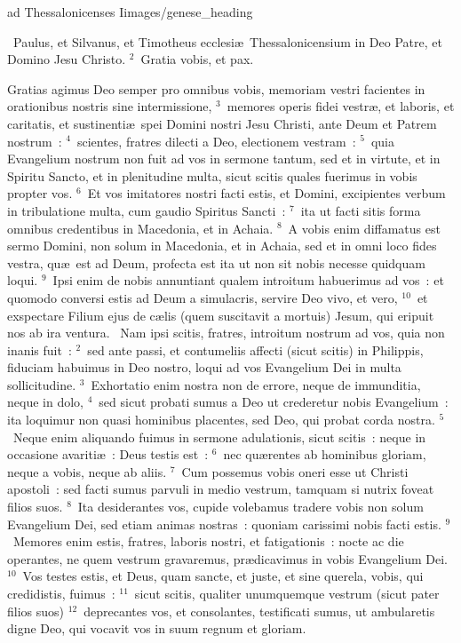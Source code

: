 {ad Thessalonicenses I}{images/genese_heading}

~\lettrine[lines=10,image=true,loversize=0.05,lraise=-0.03]{P}{}aulus, et Silvanus, et Timotheus ecclesi\ae\ Thessalonicensium in Deo Patre, et Domino Jesu Christo.
${}^{2}$~Gratia vobis, et pax.

 Gratias agimus Deo semper pro omnibus vobis, memoriam vestri facientes in orationibus nostris sine intermissione,
${}^{3}$~memores operis fidei vestr\ae , et laboris, et caritatis, et sustinenti\ae\ spei Domini nostri Jesu Christi, ante Deum et Patrem nostrum~:
${}^{4}$~scientes, fratres dilecti a Deo, electionem vestram~:
${}^{5}$~quia Evangelium nostrum non fuit ad vos in sermone tantum, sed et in virtute, et in Spiritu Sancto, et in plenitudine multa, sicut scitis quales fuerimus in vobis propter vos.
${}^{6}$~Et vos imitatores nostri facti estis, et Domini, excipientes verbum in tribulatione multa, cum gaudio Spiritus Sancti~:
${}^{7}$~ita ut facti sitis forma omnibus credentibus in Macedonia, et in Achaia.
${}^{8}$~A vobis enim diffamatus est sermo Domini, non solum in Macedonia, et in Achaia, sed et in omni loco fides vestra, qu\ae\ est ad Deum, profecta est ita ut non sit nobis necesse quidquam loqui.
${}^{9}$~Ipsi enim de nobis annuntiant qualem introitum habuerimus ad vos~: et quomodo conversi estis ad Deum a simulacris, servire Deo vivo, et vero,
${}^{10}$~et exspectare Filium ejus de c\ae lis (quem suscitavit a mortuis) Jesum, qui eripuit nos ab ira ventura.
~\lettrine[lines=10,image=true,loversize=0.05,lraise=-0.03]{N}{}am ipsi scitis, fratres, introitum nostrum ad vos, quia non inanis fuit~:
${}^{2}$~sed ante passi, et contumeliis affecti (sicut scitis) in Philippis, fiduciam habuimus in Deo nostro, loqui ad vos Evangelium Dei in multa sollicitudine.
${}^{3}$~Exhortatio enim nostra non de errore, neque de immunditia, neque in dolo,
${}^{4}$~sed sicut probati sumus a Deo ut crederetur nobis Evangelium~: ita loquimur non quasi hominibus placentes, sed Deo, qui probat corda nostra.
${}^{5}$~Neque enim aliquando fuimus in sermone adulationis, sicut scitis~: neque in occasione avariti\ae~: Deus testis est~:
${}^{6}$~nec qu\ae rentes ab hominibus gloriam, neque a vobis, neque ab aliis.
${}^{7}$~Cum possemus vobis oneri esse ut Christi apostoli~: sed facti sumus parvuli in medio vestrum, tamquam si nutrix foveat filios suos.
${}^{8}$~Ita desiderantes vos, cupide volebamus tradere vobis non solum Evangelium Dei, sed etiam animas nostras~: quoniam carissimi nobis facti estis.
${}^{9}$~Memores enim estis, fratres, laboris nostri, et fatigationis~: nocte ac die operantes, ne quem vestrum gravaremus, pr\ae dicavimus in vobis Evangelium Dei.
${}^{10}$~Vos testes estis, et Deus, quam sancte, et juste, et sine querela, vobis, qui credidistis, fuimus~:
${}^{11}$~sicut scitis, qualiter unumquemque vestrum (sicut pater filios suos)
${}^{12}$~deprecantes vos, et consolantes, testificati sumus, ut ambularetis digne Deo, qui vocavit vos in suum regnum et gloriam.


